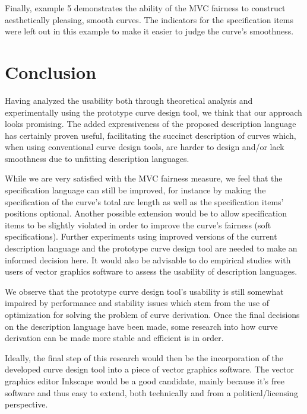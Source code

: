 \documentclass[a4paper]{article}
\begin{document}
			Finally, example 5 demonstrates the ability of the MVC fairness to construct aesthetically pleasing, smooth curves. The indicators for the specification items were left out in this example to make it easier to judge the curve's smoothness.

	\section{Conclusion}
	\label{section:conclusion}

		Having analyzed the usability both through theoretical analysis and experimentally using the prototype curve design tool, we think that our approach looks promising. The added expressiveness of the proposed description language has certainly proven useful, facilitating the succinct description of curves which, when using conventional curve design tools, are harder to design and/or lack smoothness due to unfitting description languages.

		While we are very satisfied with the MVC fairness measure, we feel that the specification language can still be improved, for instance by making the specification of the curve's total arc length as well as the specification items' positions optional. Another possible extension would be to allow specification items to be slightly violated in order to improve the curve's fairness (soft specifications). Further experiments using improved versions of the current description language and the prototype curve design tool are needed to make an informed decision here. It would also be advisable to do empirical studies with users of vector graphics software to assess the usability of description languages.

		We observe that the prototype curve design tool's usability is still somewhat impaired by performance and stability issues which stem from the use of optimization for solving the problem of curve derivation. Once the final decisions on the description language have been made, some research into how curve derivation can be made more stable and efficient is in order.

		Ideally, the final step of this research would then be the incorporation of the developed curve design tool into a piece of vector graphics software. The vector graphics editor Inkscape would be a good candidate, mainly because it's free software and thus easy to extend, both technically and from a political/licensing perspective.

	\clearpage
\end{document}
